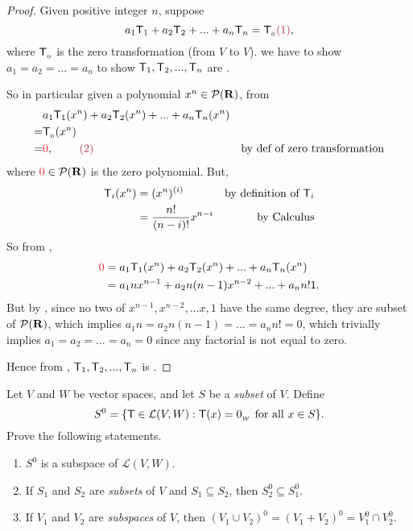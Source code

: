 \begin{proof}
Given positive integer \(n\), suppose
\[
    a_1\T_1 + a_2\T_2 + ... + a_n\T_n = \TZERO \MAROON{(1)},
\]
where \(\textsf{T}_{_0}\) is the zero transformation (from \(V\) to \(V\)).
we have to show \(a_1 = a_2 = ... = a_n\) to show \(\textsf{T}_1, \textsf{T}_2, ..., \textsf{T}_n\) are \LID{}.

So in particular given a polynomial \(x^n \in \mathcal{P}(\mathbf{R})\), from 
\begin{align*}
      & a_1 \T_1(x^n) + a_2 \T_2(x^n) + ... + a_n \T_n(x^n) \\
    = & \TZERO(x^n) \\
    = & \RED{0}, \MAROON{\ \ \ \ \ \ \ (2)} & \text{by def of zero transformation}
\end{align*}
where \(\RED{0} \in \mathcal{P}(\SET{R})\) is the zero polynomial.
But,
\begin{align*}
    \textsf{T}_i(x^n) & = (x^n)^{(i)} & \text{by definition of \(\textsf{T}_i\)} \\
              & = \frac{n!}{(n-i)!}x^{n - i} & \text{by Calculus}
\end{align*}
So from ,
\begin{align*}
    \RED{0} & = a_1 \T_1(x^n) + a_2 \T_2(x^n) + ... + a_n \T_n(x^n) \\
            & = a_1 n x^{n - 1} + a_2 n(n-1) x^{n - 2} + ... + a_n n! 1.
\end{align*}
But by , since no two of \(x^{n - 1}, x^{n - 2}, ... x, 1\) have the same degree, they are \LID{} subset of \(\mathcal{P}(\mathbf{R})\),
which implies \(a_1 n = a_2 n(n - 1) = ... = a_n n! = 0\),
which trivially implies \(a_1 = a_2 = ... = a_n = 0\) since any factorial is not equal to zero.

Hence from , \(\textsf{T}_1, \textsf{T}_2, ..., \textsf{T}_n\) is \LID{}.
\end{proof}

\begin{exercise} \label{exercise 2.2.16}
Let \(V\) and \(W\) be vector spaces, and let \(S\) be a \emph{subset} of \(V\).
Define
\[
    S^0 = \{ \textsf{T} \in \mathcal{L}(V, W) : \textsf{T}(x) = 0_{_W} \text{ for all } x \in S \}.
\]
Prove the following statements.
\begin{enumerate}
\item \(S^0\) is a subspace of \(\mathcal{L}(V, W)\).
\item If \(S_1\) and \(S_2\) are \emph{subsets} of \(V\) and \(S_1 \subseteq S_2\), then \(S_2^0 \subseteq S_1^0\).
\item If \(V_1\) and \(V_2\) are \emph{subspaces} of \(V\), then \((V_1 \cup V_2)^0 = (V_1 + V_2)^0 = V_1^0 \cap V_2^0\).
\end{enumerate}
\end{exercise}

